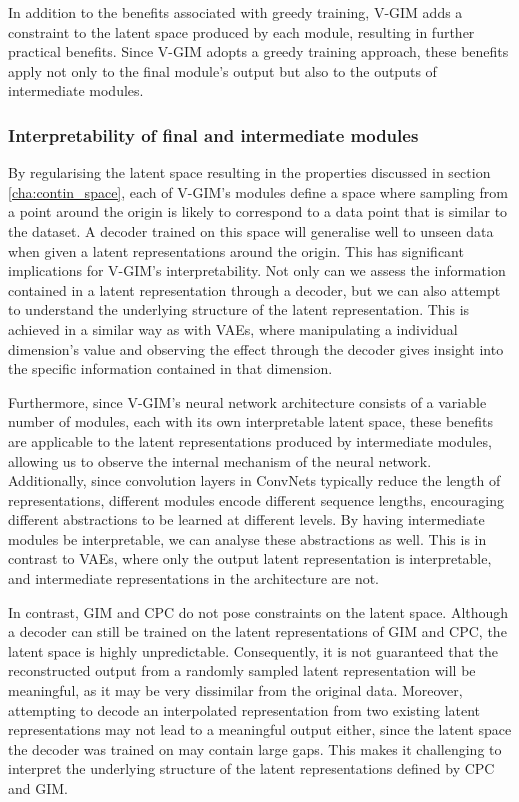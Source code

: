 	In addition to the benefits associated with greedy training, V-GIM adds a constraint to the latent space produced by each module, resulting in further practical benefits. Since V-GIM adopts a greedy training approach, these benefits apply not only to the final module's output but also to the outputs of intermediate modules.
	

	\subsubsection{Interpretability of final and intermediate modules}
		By regularising the latent space resulting in the properties discussed in section \ref{cha:contin_space}, each of V-GIM's modules define a space where sampling from a point around the origin is likely to correspond to a data point that is similar to the dataset. A decoder trained on this space will generalise well to unseen data when given a latent representations around the origin. This has significant implications for V-GIM's interpretability. Not only can we assess the information contained in a latent representation through a decoder, but we can also attempt to understand the underlying structure of the latent representation. This is achieved in a similar way as with VAEs, where manipulating a individual dimension's value and observing the effect through the decoder gives insight into the specific information contained in that dimension.
		
		Furthermore, since V-GIM's neural network architecture consists of a variable number of modules, each with its own interpretable latent space, these benefits are applicable to the latent representations produced by intermediate modules, allowing us to observe the internal mechanism of the neural network. Additionally, since convolution layers in ConvNets typically reduce the length of representations, different modules encode different sequence lengths, encouraging different abstractions to be learned at different levels. By having intermediate modules be interpretable, we can analyse these abstractions as well. This is in contrast to VAEs, where only the output latent representation is interpretable, and intermediate representations in the architecture are not.
		
		In contrast, GIM and CPC do not pose constraints on the latent space. Although a decoder can still be trained on the latent representations of GIM and CPC, the latent space is highly unpredictable. Consequently, 
		it is not guaranteed that the reconstructed output from a randomly sampled latent representation will be meaningful, as it may be very dissimilar from the original data. Moreover, attempting to decode an interpolated representation from two existing latent representations may not lead to a meaningful output either, since the latent space the decoder was trained on may contain large gaps. This makes it challenging to interpret the underlying structure of the latent representations defined by CPC and GIM.

